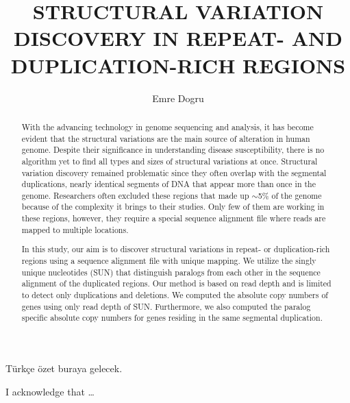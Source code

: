 \documentclass{buthesis}
\title{STRUCTURAL VARIATION DISCOVERY IN REPEAT- AND DUPLICATION-RICH REGIONS}
\author{Emre Dogru}
\begin{document}
\titlepageMS %
\signaturepageMS %

\thispagestyle{plain}
\begin{abstract}
With the advancing technology in genome sequencing and analysis, it has become evident that the structural variations are the main source of alteration in human genome. Despite their significance in understanding disease susceptibility, there is no algorithm yet to find all types and sizes of structural variations at once. Structural variation discovery remained problematic since they often overlap with the segmental duplications, nearly identical segments of DNA that appear more than once in the genome. Researchers often excluded these regions that made up $\sim$5\% of the genome because of the complexity it brings to their studies. Only few of them are working in these regions, however, they require a special sequence alignment file where reads are mapped to multiple locations.

In this study, our aim is to discover structural variations in repeat- or duplication-rich regions using a sequence alignment file with unique mapping. We utilize the singly unique nucleotides (SUN) that distinguish paralogs from each other in the sequence alignment of the duplicated regions. Our method is based on read depth and is limited to detect only duplications and deletions. We computed the absolute copy numbers of genes using only read depth of SUN. Furthermore, we also computed the paralog specific absolute copy numbers for genes residing in the same segmental duplication.


\end{abstract}

\begin{ozet}
 T\"urk\c ce \"ozet buraya gelecek. 
\end{ozet}

\begin{ack}
 I acknowledge that \ldots
\end{ack}

\tableofcontents
\listoffigures
\listoftables
\listofalgorithms
\newpage
\newpage
%
\newpage 
\pagestyle{headings}
\makeatother
\end{document}
